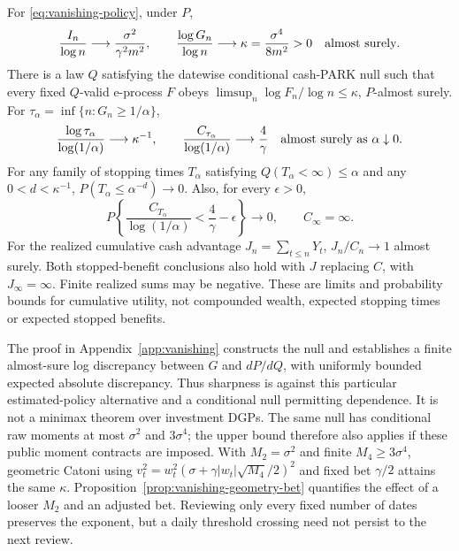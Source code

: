 \begin{theorem}
\label{thm:vanishing}
For \eqref{eq:vanishing-policy}, under $P$,
\begin{equation}
 \frac{I_n}{\log n}\longrightarrow\frac{\sigma^2}{\gamma^2m^2},
 \qquad
 \frac{\log G_n}{\log n}\longrightarrow
 \kappa=\frac{\sigma^4}{8m^2}>0
 \quad\hbox{almost surely}.
 \label{eq:vanishing-rate}
\end{equation}
There is a law $Q$ satisfying the datewise conditional cash-PARK null such
that every fixed $Q$-valid e-process $F$ obeys
$\limsup_n\log F_n/\log n\le\kappa$, $P$-almost surely.
For $\tau_\alpha=\inf\{n:G_n\ge1/\alpha\}$,
\begin{equation}
 \frac{\log\tau_\alpha}{\log(1/\alpha)}\longrightarrow\kappa^{-1},
 \qquad
 \frac{C_{\tau_\alpha}}{\log(1/\alpha)}\longrightarrow\frac4\gamma
 \quad\hbox{almost surely as }\alpha\downarrow0.
 \label{eq:vanishing-cost}
\end{equation}
For any family of stopping times $T_\alpha$ satisfying
$Q(T_\alpha<\infty)\le\alpha$ and any $0<d<\kappa^{-1}$,
$P(T_\alpha\le\alpha^{-d})\to0$. Also, for every $\epsilon>0$,
\[
 P\!\left\{\frac{C_{T_\alpha}}{\log(1/\alpha)}
                   <\frac4\gamma-\epsilon\right\}\longrightarrow0,
 \qquad C_\infty=\infty.
\]
For the realized cumulative cash advantage $J_n=\sum_{t\le n}Y_t$,
$J_n/C_n\to1$ almost surely. Both stopped-benefit conclusions also hold
with $J$ replacing $C$, with $J_\infty=\infty$. Finite realized sums may
be negative. These are limits and probability bounds for cumulative utility,
not compounded wealth, expected stopping times or expected stopped benefits.
\end{theorem}

The proof in Appendix~\ref{app:vanishing} constructs the null and establishes
a finite almost-sure log discrepancy between $G$ and $dP/dQ$, with uniformly
bounded expected absolute discrepancy. Thus sharpness is against this
particular estimated-policy alternative and a conditional null permitting
dependence. It is not a minimax theorem over investment DGPs. The same null
has conditional raw moments at most $\sigma^2$ and $3\sigma^4$; the upper bound
therefore also applies if these public moment contracts are imposed.
With $M_2=\sigma^2$ and finite $M_4\ge3\sigma^4$, geometric Catoni using
$v_t^2=w_t^2(\sigma+\gamma|w_t|\sqrt{M_4}/2)^2$ and fixed bet $\gamma/2$
attains the same $\kappa$. Proposition~\ref{prop:vanishing-geometry-bet}
quantifies the effect of a looser $M_2$ and an adjusted bet.
Reviewing only every fixed number of dates preserves the exponent, but a
daily threshold crossing need not persist to the next review.


